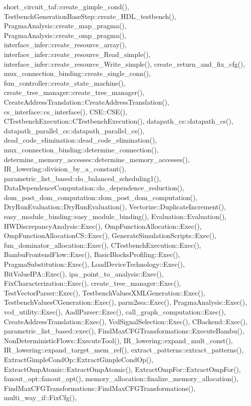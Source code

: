 short\+\_\+circuit\+\_\+taf\+::create\+\_\+gimple\+\_\+cond(), Testbench\+Generation\+Base\+Step\+::create\+\_\+\+H\+D\+L\+\_\+testbench(), Pragma\+Analysis\+::create\+\_\+map\+\_\+pragma(), Pragma\+Analysis\+::create\+\_\+omp\+\_\+pragma(), interface\+\_\+infer\+::create\+\_\+resource\+\_\+array(), interface\+\_\+infer\+::create\+\_\+resource\+\_\+\+Read\+\_\+simple(), interface\+\_\+infer\+::create\+\_\+resource\+\_\+\+Write\+\_\+simple(), create\+\_\+return\+\_\+and\+\_\+fix\+\_\+cfg(), mux\+\_\+connection\+\_\+binding\+::create\+\_\+single\+\_\+conn(), fsm\+\_\+controller\+::create\+\_\+state\+\_\+machine(), create\+\_\+tree\+\_\+manager\+::create\+\_\+tree\+\_\+manager(), Create\+Address\+Translation\+::\+Create\+Address\+Translation(), cs\+\_\+interface\+::cs\+\_\+interface(), C\+S\+E\+::\+C\+S\+E(), C\+Testbench\+Execution\+::\+C\+Testbench\+Execution(), datapath\+\_\+cs\+::datapath\+\_\+cs(), datapath\+\_\+parallel\+\_\+cs\+::datapath\+\_\+parallel\+\_\+cs(), dead\+\_\+code\+\_\+elimination\+::dead\+\_\+code\+\_\+elimination(), mux\+\_\+connection\+\_\+binding\+::determine\+\_\+connection(), determine\+\_\+memory\+\_\+accesses\+::determine\+\_\+memory\+\_\+accesses(), I\+R\+\_\+lowering\+::division\+\_\+by\+\_\+a\+\_\+constant(), parametric\+\_\+list\+\_\+based\+::do\+\_\+balanced\+\_\+scheduling1(), Data\+Dependence\+Computation\+::do\+\_\+dependence\+\_\+reduction(), dom\+\_\+post\+\_\+dom\+\_\+computation\+::dom\+\_\+post\+\_\+dom\+\_\+computation(), Dry\+Run\+Evaluation\+::\+Dry\+Run\+Evaluation(), Vectorize\+::\+Duplicate\+Increment(), easy\+\_\+module\+\_\+binding\+::easy\+\_\+module\+\_\+binding(), Evaluation\+::\+Evaluation(), H\+W\+Discrepancy\+Analysis\+::\+Exec(), Omp\+Function\+Allocation\+::\+Exec(), Omp\+Function\+Allocation\+C\+S\+::\+Exec(), Generate\+Simulation\+Scripts\+::\+Exec(), fun\+\_\+dominator\+\_\+allocation\+::\+Exec(), C\+Testbench\+Execution\+::\+Exec(), Bambu\+Frontend\+Flow\+::\+Exec(), Basic\+Blocks\+Profiling\+::\+Exec(), Pragma\+Substitution\+::\+Exec(), Load\+Device\+Technology\+::\+Exec(), Bit\+Value\+I\+P\+A\+::\+Exec(), ipa\+\_\+point\+\_\+to\+\_\+analysis\+::\+Exec(), Fix\+Characterization\+::\+Exec(), create\+\_\+tree\+\_\+manager\+::\+Exec(), Test\+Vector\+Parser\+::\+Exec(), Testbench\+Values\+X\+M\+L\+Generation\+::\+Exec(), Testbench\+Values\+C\+Generation\+::\+Exec(), parm2ssa\+::\+Exec(), Pragma\+Analysis\+::\+Exec(), vcd\+\_\+utility\+::\+Exec(), Aadl\+Parser\+::\+Exec(), call\+\_\+graph\+\_\+computation\+::\+Exec(), Create\+Address\+Translation\+::\+Exec(), Vcd\+Signal\+Selection\+::\+Exec(), C\+Backend\+::\+Exec(), parametric\+\_\+list\+\_\+based\+::exec(), Find\+Max\+C\+F\+G\+Transformations\+::\+Execute\+Bambu(), Non\+Deterministic\+Flows\+::\+Execute\+Tool(), I\+R\+\_\+lowering\+::expand\+\_\+mult\+\_\+const(), I\+R\+\_\+lowering\+::expand\+\_\+target\+\_\+mem\+\_\+ref(), extract\+\_\+patterns\+::extract\+\_\+patterns(), Extract\+Gimple\+Cond\+Op\+::\+Extract\+Gimple\+Cond\+Op(), Extract\+Omp\+Atomic\+::\+Extract\+Omp\+Atomic(), Extract\+Omp\+For\+::\+Extract\+Omp\+For(), fanout\+\_\+opt\+::fanout\+\_\+opt(), memory\+\_\+allocation\+::finalize\+\_\+memory\+\_\+allocation(), Find\+Max\+C\+F\+G\+Transformations\+::\+Find\+Max\+C\+F\+G\+Transformations(), multi\+\_\+way\+\_\+if\+::\+Fix\+Cfg(), 